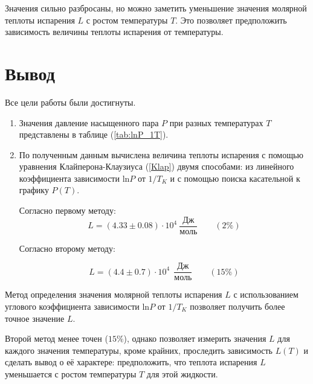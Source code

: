 \documentclass[a4paper,12pt]{article} %
\begin{document}
Значения сильно разбросаны, но можно заметить уменьшение значения молярной теплоты испарения $L$ с ростом температуры $T$. 
Это позволяет предположить зависимость величины теплоты испарения от температуры.

\section*{Вывод}

Все цели работы были достигнуты. 

\begin{enumerate}
  \item Значения давление насыщенного пара $P$ при разных температурах $T$ представлены в таблице (\ref{tab:lnP_1T}). 
  \item По полученным данным вычислена величина теплоты испарения с помощью уравнения Клайперона-Клаузиуса (\ref{Klap}) 
  двумя способами: из линейного коэффициента зависимости $\mbox{ln}P$ от $1/T_K$ и с помощью поиска касательной к графику $P(T)$. 
  
  Согласно первому методу:
  \begin{equation}
    L = (4.33 \pm 0.08) \cdot 10^{4}\ \frac{\mbox{Дж}}{\mbox{моль}} \qquad (2\%) 
  \end{equation}

  Согласно второму методу:
  
  \begin{equation}
    L = (4.4 \pm 0.7) \cdot 10^{4}\ \ \frac{\mbox{Дж}}{\mbox{моль}} \qquad (15\%)
  \end{equation}
\end{enumerate}

Метод определения значения молярной теплоты испарения $L$ с использованием углового коэффициента зависимости $\mbox{ln}P$ от $1/T_K$ позволяет получить более точное значение $L$. 

Второй метод менее точен ($15\%$), однако позволяет измерить значения  $L$ для каждого значения температуры, кроме крайних, проследить зависимость $L(T)$ и сделать вывод о её характере: 
предположить, что теплота испарения $L$ уменьшается с ростом температуры $T$ для этой жидкости.
\end{document}

